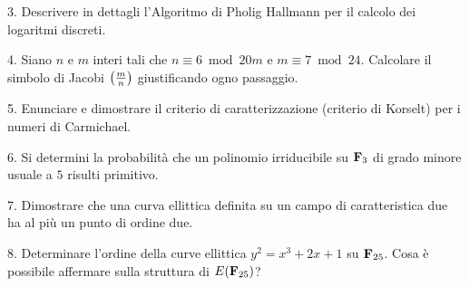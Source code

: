 \item{3.} Descrivere in dettagli l'Algoritmo di Pholig Hallmann per il calcolo dei logaritmi discreti.\vv

\item{4.} Siano $n$ e $m$ interi tali che $n\equiv 6\bmod 20m$ e $m\equiv 7\bmod 24$. 
          Calcolare il simbolo di Jacobi $\left({m\over n}\right)$ giustificando ogno passaggio.  \ve\vs

\item{5.} Enunciare e dimostrare il criterio di caratterizzazione (criterio di Korselt) per i numeri di Carmichael.\vv

\item{6.} Si determini la probabilit\`a che un polinomio irriducibile 
          su ${\bf F}_3$ di grado minore usuale a $5$ risulti primitivo.\ve\vs

\item{7.} Dimostrare che una curva ellittica definita su un campo di caratteristica due ha al pi\`u un punto di ordine due.\vv

\item{8.} Determinare l'ordine della curve ellittica $y^2=x^3+2x+1$ su ${\bf F}_{25}$. Cosa \`e possibile affermare sulla
          struttura di $E({\bf F}_{25})$?%

 
\bye
